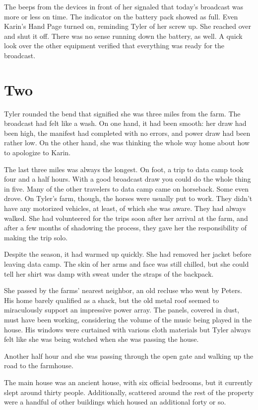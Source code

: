 \documentclass[courier]{sffms}
\begin{document}
The beeps from the devices in front of her signaled that
today's broadcast was more or less on time. The indicator on the
battery pack showed as full. Even Karin's Hand Page turned on,
reminding Tyler of her screw up. She reached over and shut it
off. There was no sense running down the battery, as well. A
quick look over the other equipment verified that everything was
ready for the broadcast.

\chapter{Two}
Tyler rounded the bend that signified she was three miles from
the farm. The broadcast had felt like a wash. On one hand, it
had been smooth: her draw had been high, the manifest had
completed with no errors, and power draw had been rather low. On
the other hand, she was thinking the whole way home about how to
apologize to Karin.

The last three miles was always the longest. On foot, a trip to
data camp took four and a half hours. With a good broadcast draw
you could do the whole thing in five. Many of the other
travelers to data camp came on horseback. Some even drove. On
Tyler's farm, though, the horses were usually put to work. They
didn't have any motorized vehicles, at least, of which she was
aware. They had always walked. She had volunteered for the trips
soon after her arrival at the farm, and after a few months of
shadowing the process, they gave her the responsibility of
making the trip solo.

Despite the season, it had warmed up quickly. She had removed
her jacket before leaving data camp. The skin of her arms and
face was still chilled, but she could tell her shirt was damp
with sweat under the straps of the backpack.

She passed by the farms' nearest neighbor, an old recluse who
went by Peters. His home barely qualified as a shack, but the
old metal roof seemed to miraculously support an impressive
power array. The panels, covered in dust, must have been
working, considering the volume of the music being played in the
house. His windows were curtained with various cloth materials
but Tyler always felt like she was being watched when she was
passing the house.

Another half hour and she was passing through the open gate and
walking up the road to the farmhouse.

The main house was an ancient house, with six official bedrooms,
but it currently slept around thirty people. Additionally,
scattered around the rest of the property were a handful of
other buildings which housed an additional forty or so.
\end{document}
